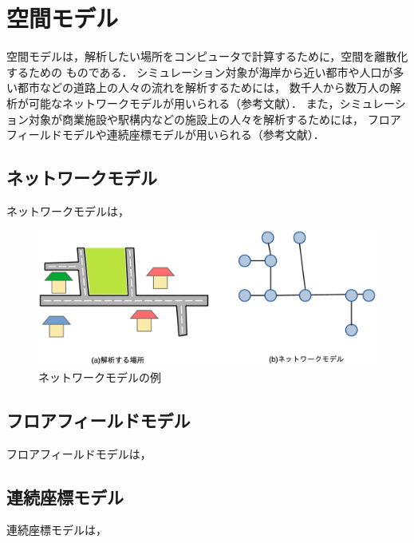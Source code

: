 \section{空間モデル}
空間モデルは，解析したい場所をコンピュータで計算するために，空間を離散化するための
ものである．
シミュレーション対象が海岸から近い都市や人口が多い都市などの道路上の人々の流れを解析するためには，
数千人から数万人の解析が可能なネットワークモデルが用いられる（参考文献）．
また，シミュレーション対象が商業施設や駅構内などの施設上の人々を解析するためには，
フロアフィールドモデルや連続座標モデルが用いられる（参考文献）．



\subsection{ネットワークモデル}
ネットワークモデルは，

\begin{figure}[h]
    \begin{center}
     \includegraphics[width=14cm,clip]{figure/networkmodel_ex.eps}
     \caption{ネットワークモデルの例}
     \label{fig:jinryu_image2}
    \end{center}
\end{figure}


\subsection{フロアフィールドモデル}
フロアフィールドモデルは，


\subsection{連続座標モデル}
連続座標モデルは，


